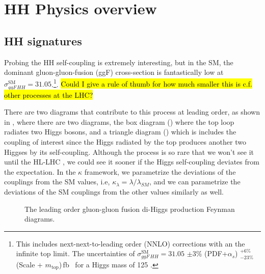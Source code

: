 \chapter{HH Physics overview}
\label{ch:hh-phys}
\def\figpath{figures/nr-int-note/intro/V1/}

\def\kl{$\kappa_\lambda$}

\section{HH signatures}

Probing the HH self-coupling is extremely interesting, but in the SM, the dominant gluon-gluon-fusion (ggF) cross-section is fantastically low at $\sigma_{ggF\,HH}^{\text{SM}} = 31.05$.\footnote{This includes next-next-to-leading order (NNLO) corrections with an the infinite top limit. The uncertainties  of $\sigma_{ggF\,HH}^{\text{SM}} = 31.05$ $\pm 3\%$ (PDF+$\alpha_{s}$) $^{+ 6\%}_{-23\%}$ (Scale + $m_{\text{top}}$)\,fb~\cite{Grazzini_2018} for a Higgs mass of 125 \GeV.}.
\hl{Could I give a rule of thumb for how much smaller this is c.f. other processes at the LHC?}

There are two diagrams that contribute to this process at leading order, as shown in \Fig{\ref{fig:ggF_feyn_dias}}, where there are two diagrams, the box diagram (\Fig{\ref{fig:ggF_feyn_dias}}) where the top loop radiates two Higgs bosons, and a triangle diagram (\Fig{\ref{fig:ggF_feyn_dias}}) which is includes the coupling of interest since the Higgs radiated by the top produces another two Higgses by its self-coupling. 
Although the process is so rare that we won't see it until the HL-LHC \cite{hh-proj}, we could see it sooner if the Higgs self-coupling deviates from the expectation. In the $\kappa$ framework, we parametrize the deviations of the couplings from the SM values, i.e, $\kappa_\lambda = \lambda / \lambda_{SM}$, and we can parametrize the deviations of the SM couplings from the other values similarly as well.

\begin{figure}[h]
    \centering
    \caption{The leading order gluon-gluon fusion di-Higgs production Feynman diagrams.}
    \label{fig:ggF_feyn_dias}
\end{figure}


